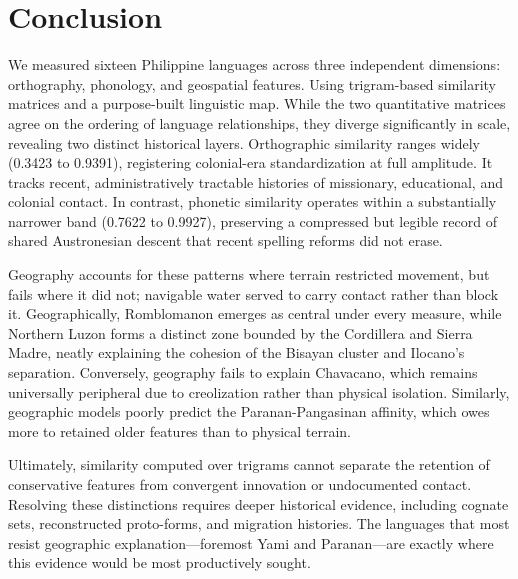 \section{Conclusion}\label{sec:conclusion}

We measured sixteen Philippine languages across three independent dimensions:
orthography, phonology, and geospatial features. Using trigram-based similarity
matrices and a purpose-built linguistic map. While the two quantitative
matrices agree on the ordering of language relationships, they diverge
significantly in scale, revealing two distinct historical layers. Orthographic
similarity ranges widely (0.3423 to 0.9391), registering colonial-era
standardization at full amplitude. It tracks recent, administratively tractable
histories of missionary, educational, and colonial contact. In contrast,
phonetic similarity operates within a substantially narrower band (0.7622 to
0.9927), preserving a compressed but legible record of shared Austronesian
descent that recent spelling reforms did not erase.

Geography accounts for these patterns where terrain restricted movement, but
fails where it did not; navigable water served to carry contact rather than
block it. Geographically, Romblomanon emerges as central under every measure,
while Northern Luzon forms a distinct zone bounded by the Cordillera and Sierra
Madre, neatly explaining the cohesion of the Bisayan cluster and Ilocano's
separation. Conversely, geography fails to explain Chavacano, which remains
universally peripheral due to creolization rather than physical isolation.
Similarly, geographic models poorly predict the Paranan-Pangasinan affinity,
which owes more to retained older features than to physical terrain.

Ultimately, similarity computed over trigrams cannot separate the retention of
conservative features from convergent innovation or undocumented contact.
Resolving these distinctions requires deeper historical evidence, including
cognate sets, reconstructed proto-forms, and migration histories. The languages
that most resist geographic explanation—foremost Yami and Paranan—are exactly
where this evidence would be most productively sought.
